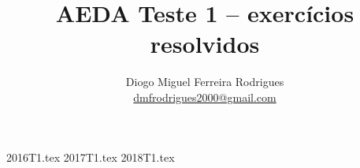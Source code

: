 \documentclass{aeda_test}
\title{AEDA Teste 1 -- exercícios resolvidos}
\author{Diogo Miguel Ferreira Rodrigues \\ \href{mailto:dmfrodrigues2000@gmail.com}{dmfrodrigues2000@gmail.com}}
\date{}
\begin{document}
\begingroup
\maketitle
	\let\clearpage\relax
	\tableofcontents
\endgroup
{2016T1.tex}
{2017T1.tex}
{2018T1.tex}
\end{document}
